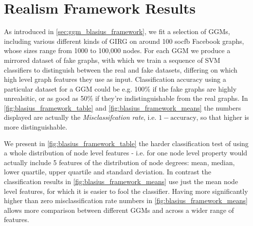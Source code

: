 \section{Realism Framework Results}

As introduced in \cref{sec:ggm_blasius_framework}, we fit a selection of GGMs, including various different kinds of GIRG on around 100 socfb Facebook graphs, whose sizes range from 1000 to 100,000 nodes. For each GGM we produce a mirrored dataset of fake graphs, with which we train a sequence of SVM classifiers to distinguish between the real and fake datasets, differing on which high level graph features they use as input. Classification accuracy using a particular dataset for a GGM could be e.g. 100\% if the fake graphs are highly unrealsitic, or as good as 50\% if they're indistinguishable from the real graphs. In \cref{fig:blasius_framework_table} and \cref{fig:blasius_framework_means} the numbers displayed are actually the \textit{Misclassifcation rate}, i.e. $1 - \text{accuracy}$, so that higher is more distinguishable.

We present in \cref{fig:blasius_framework_table} the harder classification test of using a whole distribution of node level features - i.e. for one node level property  would actually include 5 features of the distribution of node degrees: mean, median, lower quartile, upper quartile and standard deviation. In contrast the classification results in \cref{fig:blasius_framework_means} use just the mean node level features, for which it is easier to fool the classifier. Having more significantly higher than zero misclassification rate numbers in \cref{fig:blasius_framework_means} allows more comparison between different GGMs and across a wider range of features.


